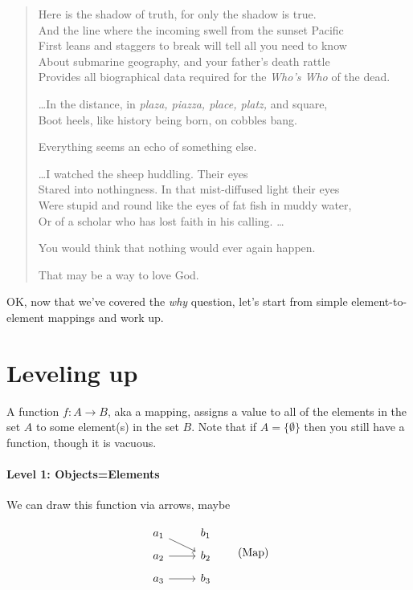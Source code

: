 \documentclass[11pt]{article}
\begin{document}
\begin{verse}
Here is the shadow of truth, for only the shadow is true.\\
And the line where the incoming swell from the sunset Pacific\\
First leans and staggers to break will tell all you need to know\\
About submarine geography, and your father's death rattle\\
Provides all biographical data required for the {\em Who's Who} of the dead.

\dots In the distance, in {\em plaza, piazza, place, platz,} and square,\\
Boot heels, like history being born, on cobbles bang.

Everything seems an echo of something else.

\dots I watched the sheep huddling.  Their eyes\\
Stared into nothingness.  In that mist-diffused light their eyes\\
Were stupid and round like the eyes of fat fish in muddy water,\\
Or of a scholar who has lost faith in his calling. \dots

You would think that nothing would ever again happen.

That may be a way to love God.
\end{verse}

OK, now that we've covered the {\em why} question, let's start from simple element-to-element
mappings and work up.

\section{Leveling up}\label{levelsec}

A function $f:A\to B$, aka a mapping, assigns a value to all of the elements in the set $A$ to
some element(s) in the set $B$. Note that if $A=\{\emptyset\}$ then you still have a function, though
it is vacuous.

\paragraph{Level 1: Objects=Elements}
We can draw this function via arrows, maybe

\begin{equation}
\begin{tikzcd}[row sep=tiny]
    a_1 \ar[rd] & b_1\\
    a_2 \ar[r] & b_2\\
    a_3 \ar[r] & b_3
\end{tikzcd}\tag{Map}
\end{equation}
\end{document}
